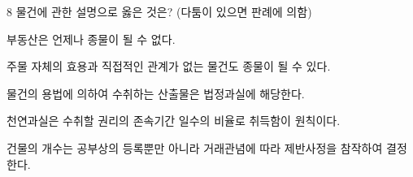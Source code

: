 \begin{question}{8}
물건에 관한 설명으로 옳은 것은? (다툼이 있으면 판례에 의함)
\begin{choices}
  \item 부동산은 언제나 종물이 될 수 없다.
  \item 주물 자체의 효용과 직접적인 관계가 없는 물건도 종물이 될 수 있다.
  \item 물건의 용법에 의하여 수취하는 산출물은 법정과실에 해당한다.
  \item 천연과실은 수취할 권리의 존속기간 일수의 비율로 취득함이 원칙이다.
  \item 건물의 개수는 공부상의 등록뿐만 아니라 거래관념에 따라 제반사정을 참작하여 결정한다.
\end{choices}
\end{question}

